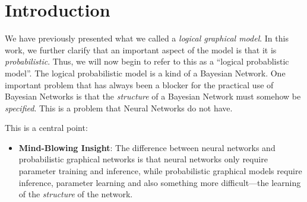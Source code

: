 \section{Introduction}
We have previously presented what we called a {\em logical graphical model}.
In this work, we further clarify that an important aspect of the model is that it is {\em probabilistic}.
Thus, we will now begin to refer to this as a ``logical probablistic model''.
The logical probabilistic model is a kind of a Bayesian Network.
One important problem that has always been a blocker for the practical use of Bayesian Networks is that the {\em structure} of a Bayesian Network must somehow be {\em specified}.
This is a problem that Neural Networks do not have.

This is a central point:
\begin{itemize}
    \item {\bf Mind-Blowing Insight}: The difference between neural networks and probabilistic graphical networks is that neural networks only require parameter training and inference, while probabilistic graphical models require inference, parameter learning and also something more difficult---the learning of the {\em structure} of the network.
\end{itemize}